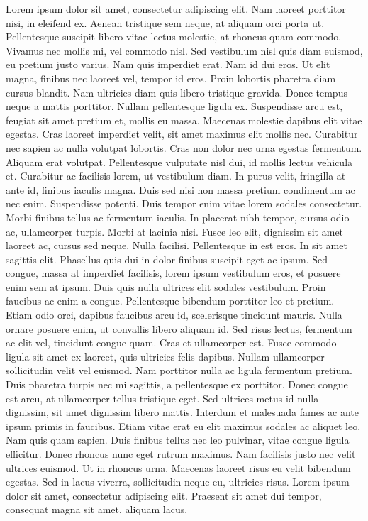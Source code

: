 \documentclass[../main.tex]{subfiles}
\begin{document}
Lorem ipsum dolor sit amet, consectetur adipiscing elit. Nam laoreet porttitor nisi, in eleifend ex. Aenean tristique sem neque, at aliquam orci porta ut. Pellentesque suscipit libero vitae lectus molestie, at rhoncus quam commodo. Vivamus nec mollis mi, vel commodo nisl. Sed vestibulum nisl quis diam euismod, eu pretium justo varius. Nam quis imperdiet erat. Nam id dui eros. Ut elit magna, finibus nec laoreet vel, tempor id eros.
Proin lobortis pharetra diam cursus blandit. Nam ultricies diam quis libero tristique gravida. Donec tempus neque a mattis porttitor. Nullam pellentesque ligula ex. Suspendisse arcu est, feugiat sit amet pretium et, mollis eu massa. Maecenas molestie dapibus elit vitae egestas. Cras laoreet imperdiet velit, sit amet maximus elit mollis nec. Curabitur nec sapien ac nulla volutpat lobortis. Cras non dolor nec urna egestas fermentum. Aliquam erat volutpat. Pellentesque vulputate nisl dui, id mollis lectus vehicula et. Curabitur ac facilisis lorem, ut vestibulum diam. In purus velit, fringilla at ante id, finibus iaculis magna. Duis sed nisi non massa pretium condimentum ac nec enim. Suspendisse potenti. Duis tempor enim vitae lorem sodales consectetur.
Morbi finibus tellus ac fermentum iaculis. In placerat nibh tempor, cursus odio ac, ullamcorper turpis. Morbi at lacinia nisi. Fusce leo elit, dignissim sit amet laoreet ac, cursus sed neque. Nulla facilisi. Pellentesque in est eros. In sit amet sagittis elit. Phasellus quis dui in dolor finibus suscipit eget ac ipsum. Sed congue, massa at imperdiet facilisis, lorem ipsum vestibulum eros, et posuere enim sem at ipsum. Duis quis nulla ultrices elit sodales vestibulum. Proin faucibus ac enim a congue. Pellentesque bibendum porttitor leo et pretium. Etiam odio orci, dapibus faucibus arcu id, scelerisque tincidunt mauris.
Nulla ornare posuere enim, ut convallis libero aliquam id. Sed risus lectus, fermentum ac elit vel, tincidunt congue quam. Cras et ullamcorper est. Fusce commodo ligula sit amet ex laoreet, quis ultricies felis dapibus. Nullam ullamcorper sollicitudin velit vel euismod. Nam porttitor nulla ac ligula fermentum pretium. Duis pharetra turpis nec mi sagittis, a pellentesque ex porttitor. Donec congue est arcu, at ullamcorper tellus tristique eget. Sed ultrices metus id nulla dignissim, sit amet dignissim libero mattis. Interdum et malesuada fames ac ante ipsum primis in faucibus. Etiam vitae erat eu elit maximus sodales ac aliquet leo. Nam quis quam sapien.
Duis finibus tellus nec leo pulvinar, vitae congue ligula efficitur. Donec rhoncus nunc eget rutrum maximus. Nam facilisis justo nec velit ultrices euismod. Ut in rhoncus urna. Maecenas laoreet risus eu velit bibendum egestas. Sed in lacus viverra, sollicitudin neque eu, ultricies risus. Lorem ipsum dolor sit amet, consectetur adipiscing elit. Praesent sit amet dui tempor, consequat magna sit amet, aliquam lacus. 
\end{document}
